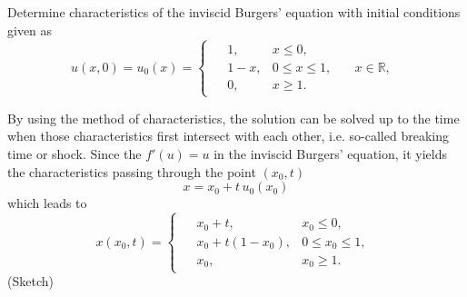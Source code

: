 \documentclass[12pt]{article}
\begin{document}
\begin{example}
	Determine characteristics of the inviscid Burgers' equation with initial conditions given as
	\begin{equation}
		u(x,0) = u_{0}(x) =
		\begin{cases}
			\begin{aligned}
				 & 1,   & x\leq 0,        &                        \\
				 & 1-x, & 0\leq x \leq 1, & \quad x\in \mathbb{R}, \\
				 & 0,   & x\geq 1.        & 
			\end{aligned}
		\end{cases}
	\end{equation}
\end{example}
By using the method of characteristics, the solution can be solved up to the time when
those characteristics first intersect with each other, i.e. so-called breaking time or shock.
Since the $f'(u) = u$ in the inviscid Burgers' equation, it yields the characteristics 
passing through the point $(x_{0},t)$
\begin{equation}
	x = x_{0} + t\,u_{0}(x_{0})
\end{equation}
which leads to
\begin{equation}
	x(x_{0},t) = 
	\begin{cases}
		\begin{aligned}
			 & x_{0}+t,          & x_{0}\leq 0,          \\
			 & x_{0}+t(1-x_{0}), & 0\leq x_{0} \leq 1,   \\
			 & x_{0},            & x_{0}\geq 1.         
		\end{aligned}
	\end{cases}
\end{equation}
(Sketch)



\end{document}
